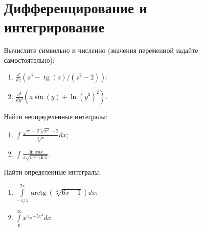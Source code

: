 \documentclass[14pt,a4paper]{article}
\begin{document}
\section{Дифференцирование и интегрирование}
\noindent Вычислите символьно и численно (значения переменной задайте самостоятельно):
\begin{multicols}{2}
\begin{enumerate}
	\item $\frac{d}{d z}\left(z^3-\operatorname{tg}(z) /\left(z^2-2\right)\right)$;
	\item $\frac{d^2}{d y^2}\left(a \sin (y)+\ln \left(y^3\right)^2\right)$.
\end{enumerate}
\end{multicols}
\noindent Найти неопределенные интегралы:
\begin{multicols}{2}
\begin{enumerate}
	\item $\int \frac{\sqrt{x}-2 \sqrt[3]{x^2}+2}{\sqrt[4]{x}} dx$;
	\item $\int \frac{\ln x d x}{x \sqrt{1+\ln x}}$.
\end{enumerate}
\end{multicols}
\noindent Найти определенные интегралы:
\begin{multicols}{2}
\begin{enumerate}
	\item $\int\limits_{-\pi/4}^{2\pi} \operatorname{arctg}(\sqrt[3]{6 x-1}) d x$;
	\item $\int\limits_{0}^{\infty} x^4e^{-5x^2}dx$. 
\end{enumerate}
\end{multicols}
\nocite{Plis2003,Krestlev2010,MathCADshortcuts,Ochkov2016}
\printbibliography[title={Рекомендуемая литература}]
\end{document}

